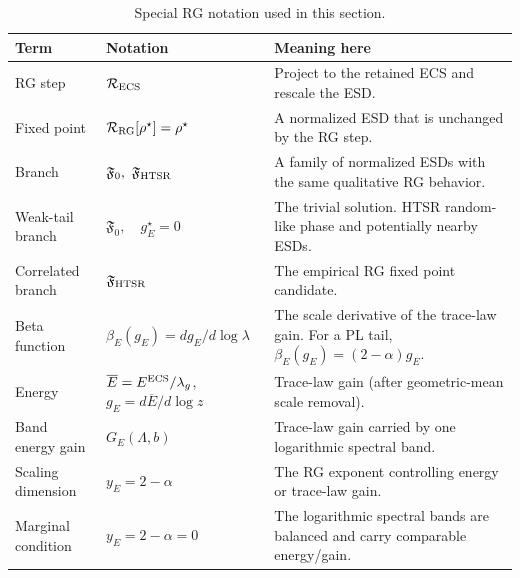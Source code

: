 \documentclass[10pt,twocolumn]{article}
\newcommand{\Fzero}{\mathfrak F_0}
\newcommand{\Fhtsr}{\mathfrak F_{\rm HTSR}}
\newif\ifUseTildeECSNotation
\newcommand{\Ered}{\ifUseTildeECSNotation \widetilde E\else E^{\rm ECS}\fi}
\begin{document}
\begin{table}[t!]
\centering
\footnotesize
\setlength{\tabcolsep}{5pt}
\renewcommand{\arraystretch}{1.05}
\caption{Special RG notation used in this section.}
\label{tab:rgterms}
\begin{tabularx}{\textwidth}{@{}p{}p{}X@{}}
\toprule
Term & Notation & Meaning here \\
\midrule
RG step &
$\mathcal R_{\rm ECS}$ &
Project to the retained ECS and rescale the ESD. \\

Fixed point &
$\mathcal R_{\rm RG}[\rho^\star]=\rho^\star$ &
A normalized ESD that is unchanged by the RG step. \\

Branch &
$\Fzero,\ \Fhtsr$ &
A family of normalized ESDs with the same qualitative RG behavior. \\

Weak-tail branch &
$\Fzero,\quad g_E^\star=0$ &
The trivial solution.  HTSR random-like phase and potentially nearby ESDs. \\

Correlated branch &
$\Fhtsr$ &
The empirical RG fixed point candidate. \\

Beta function &
$\beta_E(g_E)=d g_E/d\log\lambda$ &
The scale derivative of the trace-law gain. For a PL tail, $\beta_E(g_E)=(2-\alpha)g_E$. \\

Energy &
$\overline E=\Ered/\lambda_g$,\quad $g_E=d\overline E/d\log z$ &
Trace-law gain (after geometric-mean scale removal). \\

Band energy gain &
$\displaystyle G_E(\Lambda,b)$ &
Trace-law gain carried by one logarithmic spectral band. \\

Scaling dimension &
$y_E=2-\alpha$ &
The RG exponent controlling energy or trace-law gain.\\

Marginal condition &
$y_E=2-\alpha=0$ &
The logarithmic spectral bands are balanced and carry comparable energy/gain. \\
\bottomrule
\end{tabularx}
\vspace{-0.6em}
\end{table}
\end{document}
